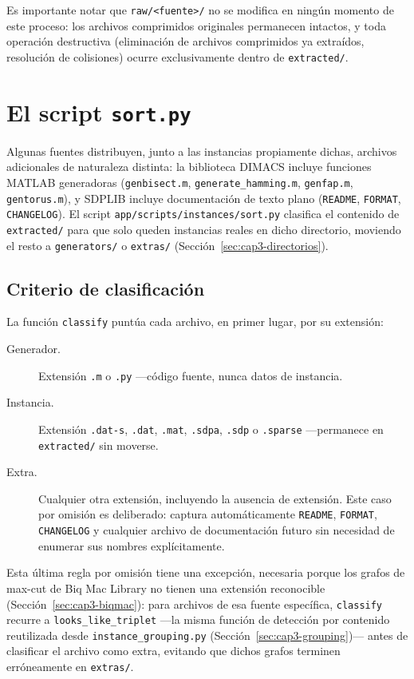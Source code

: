 Es importante notar que \texttt{raw/<fuente>/} no se modifica en ning\'un
momento de este proceso: los archivos comprimidos originales permanecen
intactos, y toda operaci\'on destructiva (eliminaci\'on de archivos
comprimidos ya extra\'idos, resoluci\'on de colisiones) ocurre
exclusivamente dentro de \texttt{extracted/}.

\section{El script \texttt{sort.py}}
\label{sec:cap3-sort}

Algunas fuentes distribuyen, junto a las instancias propiamente dichas,
archivos adicionales de naturaleza distinta: la biblioteca DIMACS incluye
funciones MATLAB generadoras (\texttt{genbisect.m}, \texttt{generate\_hamming.m},
\texttt{genfap.m}, \texttt{gentorus.m}), y SDPLIB incluye documentaci\'on de
texto plano (\texttt{README}, \texttt{FORMAT}, \texttt{CHANGELOG}). El script
\texttt{app/scripts/instances/sort.py} clasifica el contenido de
\texttt{extracted/} para que solo queden instancias reales en dicho
directorio, moviendo el resto a \texttt{generators/} o \texttt{extras/}
(Secci\'on~\ref{sec:cap3-directorios}).

\subsection{Criterio de clasificaci\'on}

La funci\'on \texttt{classify} punt\'ua cada archivo, en primer lugar, por
su extensi\'on:

\begin{description}
    \item[Generador.] Extensi\'on \texttt{.m} o \texttt{.py} —c\'odigo fuente,
    nunca datos de instancia.
    \item[Instancia.] Extensi\'on \texttt{.dat-s}, \texttt{.dat},
    \texttt{.mat}, \texttt{.sdpa}, \texttt{.sdp} o \texttt{.sparse}
    —permanece en \texttt{extracted/} sin moverse.
    \item[Extra.] Cualquier otra extensi\'on, incluyendo la ausencia de
    extensi\'on. Este caso por omisi\'on es deliberado: captura
    autom\'aticamente \texttt{README}, \texttt{FORMAT}, \texttt{CHANGELOG} y
    cualquier archivo de documentaci\'on futuro sin necesidad de enumerar sus
    nombres expl\'icitamente.
\end{description}

Esta \'ultima regla por omisi\'on tiene una excepci\'on, necesaria porque
los grafos de max-cut de Biq Mac Library no tienen una extensi\'on
reconocible (Secci\'on~\ref{sec:cap3-biqmac}): para archivos de esa fuente
espec\'ifica, \texttt{classify} recurre a \texttt{looks\_like\_triplet}
—la misma funci\'on de detecci\'on por contenido reutilizada desde
\texttt{instance\_grouping.py} (Secci\'on~\ref{sec:cap3-grouping})— antes
de clasificar el archivo como extra, evitando que dichos grafos terminen
err\'oneamente en \texttt{extras/}.

